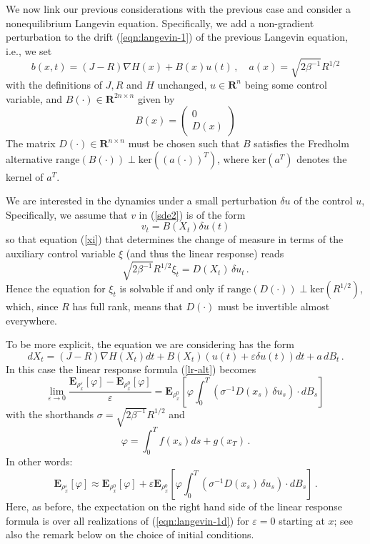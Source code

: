 \documentclass[]{tMPH2e}
\newcommand{\R}{{\mathbf R}}
\newcommand{\eps}{\varepsilon}
\newcommand{\bE}{{\mathbf E}}
\begin{document}
We now link our previous considerations with the previous case and consider a nonequilibrium Langevin equation. Specifically, we add a non-gradient perturbation to the drift (\ref{eqn:langevin-1}) of the previous Langevin equation, i.e., we set 
\begin{equation}\label{eqn:langevin-1b}
b(x,t) = (J-R)\nabla H(x) +  B(x) u(t)\,,\quad a(x) = \sqrt{2\beta^{-1}}R^{1/2}
\end{equation}
with the definitions of $J,R$ and $H$ unchanged, $u\in\R^{n}$ being some control variable, and $B(\cdot)\in\R^{2n\times n}$ given by 
\[
B(x) = \left( \begin{array}{c}
0 \\ D(x) \end{array}\right)
\]
The matrix $D(\cdot)\in\R^{n\times n}$ must be chosen such that $B$ satisfies the Fredholm alternative $\mathrm{range}(B(\cdot))\perp \mathrm{ker}((a(\cdot))^{T})$, where $\mathrm{ker}(a^T)$ denotes the kernel of $a^T$. 

We are interested in the dynamics under a small perturbation $\delta u$ of the control $u$, Specifically, we assume that $v$ in (\ref{sde2}) is of the form 
\begin{equation}\label{eqn:langevin-1c}
v_{t} = B(X_{t})\delta u(t)
\end{equation}
so that equation (\ref{xi}) that determines the change of measure in terms of the auxiliary control variable $\xi$ (and thus the linear response) reads 
\[
\sqrt{2\beta^{-1}}R^{1/2} \xi_{t} = D(X_{t})\,\delta u_{t}\,.
\]
Hence the equation for $\xi_{t}$ is solvable if and only if $\mathrm{range}(D(\cdot))\perp \mathrm{ker}(R^{1/2})$, which, since $R$ has full rank, means that $D(\cdot)$ must be invertible almost everywhere.

To be more explicit, the equation we are considering has the form
\begin{equation}\label{eqn:langevin-1d}
dX_t =  (J-R)\nabla H(X_{t})dt + B(X_t)(u(t)+\eps \delta u(t))dt+a\, dB_t\,.
\end{equation}
In this case the linear response formula (\ref{lr-alt})  becomes
\begin{equation}\label{lr-alt2}
\lim_{\eps\to 0}\frac{\bE_{\rho_{x}^{\eps}}[\varphi] - \bE_{\rho_{x}^{0}}[\varphi]}{\eps} =  \bE_{\rho_{x}^{0}}\left[\varphi\int_{0}^{T}(\sigma^{-1}D(x_{s})\,\delta u_{s})\cdot dB_{s} \right]\,
\end{equation}
with the shorthands $\sigma=\sqrt{2\beta^{-1}}R^{1/2}$ and 
\[
\varphi = \int_{0}^{T}f(x_{s})ds+g(x_{T})\,.
\]
In other words: 
\begin{equation}\label{eqn:neq-response}
\bE_{\rho_{x}^{\eps}}[\varphi] \approx \bE_{\rho_{x}^0}[\varphi] + \eps\bE_{\rho_{x}^0}\left[\varphi\int_{0}^{T}(\sigma^{-1}D(x_{s})\,\delta u_{s})\cdot dB_{s} \right]\,.
\end{equation}
Here, as before, the expectation on the right hand side of the linear response formula is over all realizations of (\ref{eqn:langevin-1d}) for $\eps=0$ starting at $x$; see also the remark below on the choice of initial conditions. 
\end{document}
